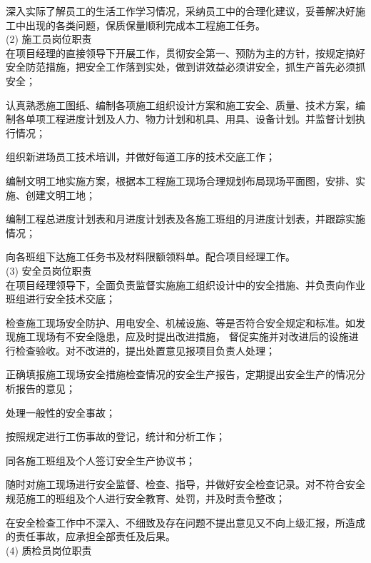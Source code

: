  深入实际了解员工的生活工作学习情况，采纳员工中的合理化建议，妥善解决好施工中出现的各类问题，保质保量顺利完成本工程施工任务。\\

(2) 施工员岗位职责\\

 在项目经理的直接领导下开展工作，贯彻安全第一、预防为主的方针，按规定搞好安全防范措施，把安全工作落到实处，做到讲效益必须讲安全，抓生产首先必须抓安全；

 认真熟悉施工图纸、编制各项施工组织设计方案和施工安全、质量、技术方案，编制各单项工程进度计划及人力、物力计划和机具、用具、设备计划。并监督计划执行情况；

 组织新进场员工技术培训，并做好每道工序的技术交底工作；

 编制文明工地实施方案，根据本工程施工现场合理规划布局现场平面图，安排、实施、创建文明工地；

 编制工程总进度计划表和月进度计划表及各施工班组的月进度计划表，并跟踪实施情况；

 向各班组下达施工任务书及材料限额领料单。配合项目经理工作。\\

(3) 安全员岗位职责\\

 在项目经理领导下，全面负责监督实施施工组织设计中的安全措施、并负责向作业班组进行安全技术交底；

 检查施工现场安全防护、用电安全、机械设施、等是否符合安全规定和标准。如发现施工现场有不安全隐患，应及时提出改进措施，
督促实施并对改进后的设施进行检查验收。对不改进的，提出处置意见报项目负责人处理；

 正确填报施工现场安全措施检查情况的安全生产报告，定期提出安全生产的情况分析报告的意见；

 处理一般性的安全事故；

 按照规定进行工伤事故的登记，统计和分析工作；

 同各施工班组及个人签订安全生产协议书；

 随时对施工现场进行安全监督、检查、指导，并做好安全检查记录。对不符合安全规范施工的班组及个人进行安全教育、处罚，并及时责令整改；

 在安全检查工作中不深入、不细致及存在问题不提出意见又不向上级汇报，所造成的责任事故，应承担全部责任及后果。\\

(4) 质检员岗位职责\\

